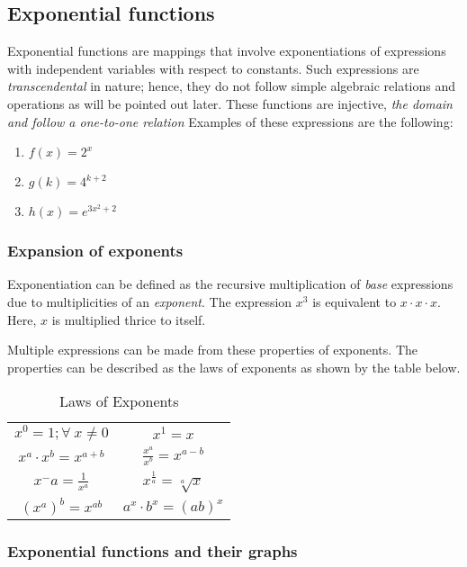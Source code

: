 \subsection{Exponential functions}

Exponential functions are mappings that involve exponentiations of expressions with independent variables with respect to constants.
Such expressions are \emph{transcendental} in nature; hence, they do not follow simple algebraic relations and operations as will be pointed out later.
These functions are injective, \emph{the domain and follow a one-to-one relation}
Examples of these expressions are the following:
\begin{enumerate}
  \item $f(x) = 2^x$
  \item $g(k) = 4^{k+2}$
  \item $h(x) = e^{3x^2+2}$
\end{enumerate}

\subsubsection{Expansion of exponents}

Exponentiation can be defined as the recursive multiplication of \emph{base} expressions due to multiplicities of an \emph{exponent}.
The expression $x^3$ is equivalent to $x\cdot x\cdot x$. Here, $x$ is multiplied thrice to itself.

Multiple expressions can be made from these properties of exponents.
The properties can be described as the laws of exponents as shown by the table below.

\begin{table}[h!]
  \centering
  \caption{Laws of Exponents}

  \begin{tabular}{c|c}
    $x^0 = 1; \forall\ x \neq 0$ & $x^1 = x$ \\
    $x^a \cdot x^b = x^{a+b}$ & $\frac{x^a}{x^b} = x^{a-b}$ \\
    $x^-a = \frac{1}{x^a}$ & $x^{\frac{1}{a}} = \sqrt[a]{x}$ \\
    $(x^a)^b = x^{ab}$ & $a^x \cdot b^x = (ab)^x$
  \end{tabular}
\end{table}

\subsubsection{Exponential functions and their graphs}

